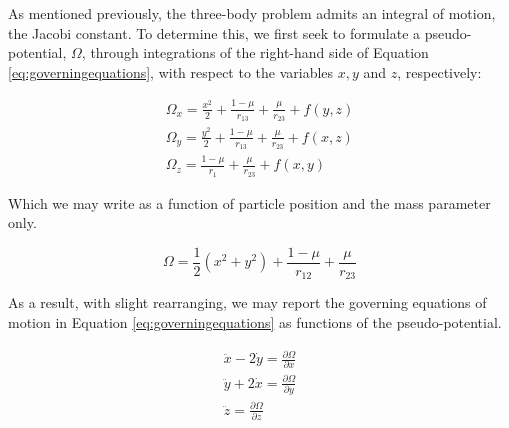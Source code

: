 As mentioned previously, the three-body problem admits an integral of motion, the Jacobi constant. To determine this, we first seek to formulate a pseudo-potential, $\Omega$, through integrations of the right-hand side of Equation \ref{eq:governingequations}, with respect to the variables $x, y$ and $z$, respectively:

\begin{align}
\Omega_x = \frac{x^2}{2} + \frac{1 - \mu}{r_13} + \frac{\mu}{r_{23}} + f(y, z) \\
\Omega_y = \frac{y^2}{2} + \frac{1 - \mu}{r_{13}} + \frac{\mu}{r_{23}} + f(x, z) \\
\Omega_z = \frac{1 - \mu}{r_1} + \frac{\mu}{r_{23}} + f(x, y)
\end{align}

\noindent Which we may write as a function of particle position and the mass parameter only.

\begin{equation}\label{eq:pseudopotential}
\Omega = \frac{1}{2} (x^2 + y^2) + \frac{1 - \mu}{r_{12}} + \frac{\mu}{r_{23}}
\end{equation}

\noindent As a result, with slight rearranging, we may report the governing equations of motion in Equation \ref{eq:governingequations} as functions of the pseudo-potential.

\begin{align}\label{eq:governingequationspseudopotential}
\ddot{x} - 2\dot{y} = \frac{\partial \Omega}{\partial x} \\
\ddot{y} + 2\dot{x} = \frac{\partial \Omega}{\partial y} \\
\ddot{z} = \frac{\partial \Omega}{\partial z} 
\end{align}





